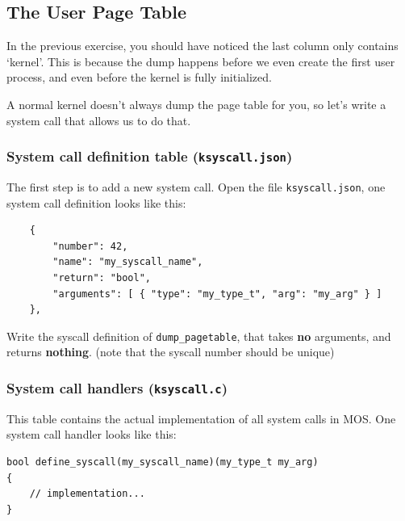 \subsection{The User Page Table}

In the previous exercise, you should have noticed the last column only contains
`kernel'. This is because the dump happens before we even create the first user
process, and even before the kernel is fully initialized.

A normal kernel doesn't always dump the page table for you, so let's write a
system call that allows us to do that.

\subsubsection{System call definition table (\texttt{ksyscall.json})}

The first step is to add a new system call. Open the file \texttt{ksyscall.json},
one system call definition looks like this:

\begin{verbatim}
    {
        "number": 42,
        "name": "my_syscall_name",
        "return": "bool",
        "arguments": [ { "type": "my_type_t", "arg": "my_arg" } ]
    },
\end{verbatim}

\begin{exercise}
    \item Write the syscall definition of \texttt{dump\_pagetable}, that takes
    \textbf{no} arguments, and returns \textbf{nothing}. (note that the syscall
    number should be unique)
\end{exercise}

\subsubsection{System call handlers (\texttt{ksyscall.c})}

This table contains the actual implementation of all system calls in MOS. One
system call handler looks like this:

\begin{verbatim}
bool define_syscall(my_syscall_name)(my_type_t my_arg)
{
    // implementation...
}
\end{verbatim}

